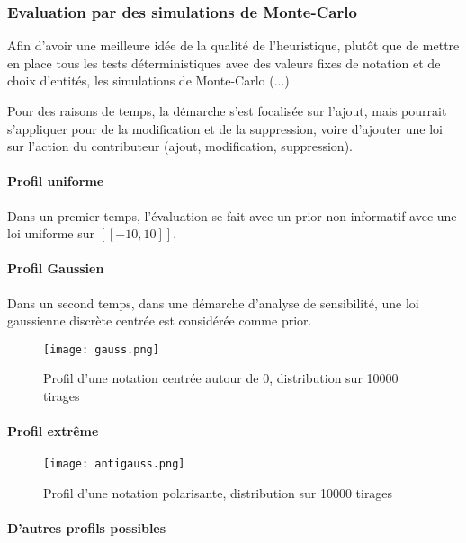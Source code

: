 \subsubsection{Evaluation par des simulations de Monte-Carlo}

Afin d'avoir une meilleure idée de la qualité de l'heuristique, plutôt que de mettre en place tous les tests déterministiques avec des valeurs fixes de notation et de choix d'entités, les simulations de Monte-Carlo (...)

Pour des raisons de temps, la démarche s'est focalisée sur l'ajout, mais pourrait s'appliquer pour de la modification et de la suppression, voire d'ajouter une loi sur l'action du contributeur (ajout, modification, suppression). 

\paragraph{Profil uniforme}

Dans un premier temps, l'évaluation se fait avec un prior non informatif avec une loi uniforme sur $[\![-10,10]\!]$.

\paragraph{Profil Gaussien}

Dans un second temps, dans une démarche d'analyse de sensibilité, une loi gaussienne discrète centrée est considérée comme prior.

\begin{figure}[ht]
  \texttt{[image: gauss.png]}
  \caption{Profil d'une notation centrée autour de 0, distribution sur 10000 tirages}
\end{figure}



\paragraph{Profil extrême}


\begin{figure}[ht]
  \texttt{[image: antigauss.png]}
  \caption{Profil d'une notation polarisante, distribution sur 10000 tirages}
\end{figure}

\paragraph{D'autres profils possibles}

